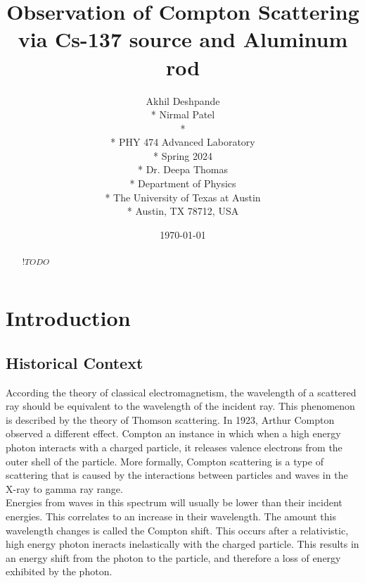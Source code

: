 \documentclass[10pt,letterpaper,onecolumn]{article}
\begin{document}
\title{Observation of Compton Scattering via Cs-137 source and Aluminum rod}
\author{
 Akhil Deshpande \\*
 Nirmal Patel \\*
 \\*
 PHY 474 Advanced Laboratory \\*
 Spring 2024 \\*
 Dr. Deepa Thomas \\*
 Department of Physics \\*
 The University of Texas at Austin \\*
 Austin, TX 78712, USA
}
\date{\today}
\maketitle
\begin{abstract}  
    $!TODO$  
\end{abstract}
\section{Introduction}
\subsection{Historical Context}
According the theory of classical electromagnetism, the wavelength of a scattered ray should be equivalent to the wavelength of the incident ray. This phenomenon is described by the theory of Thomson scattering. In 1923, Arthur Compton observed a different effect. Compton an instance in which when a high energy photon interacts with a charged particle, it releases valence electrons from the outer shell of the particle. More formally, Compton scattering is a type of scattering that is caused by the interactions between particles and waves in the X-ray to gamma ray range. \\
Energies from waves in this spectrum will usually be lower than their incident energies. This correlates to an increase in their wavelength. The amount this wavelength changes is called the Compton shift. This occurs after a relativistic, high energy photon ineracts inelastically with the charged particle. This results in an energy shift from the photon to the particle, and therefore a loss of energy exhibited by the photon.\cite{Pattison1975}
\end{document}
